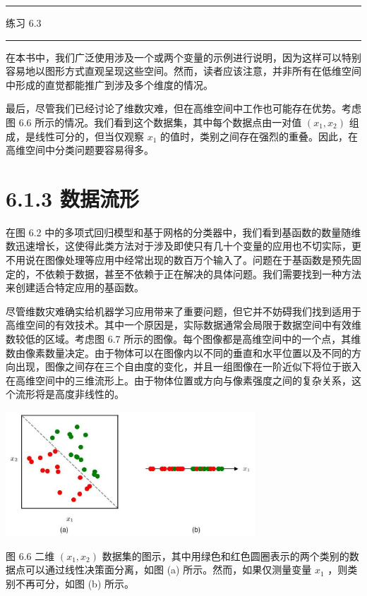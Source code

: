 \documentclass[10pt]{report}
\newcommand{\HRule}{\begin{center}\rule{0.9\linewidth}{0.2mm}\end{center}}
\begin{document}
\HRule

练习 6.3

\HRule

在本书中，我们广泛使用涉及一个或两个变量的示例进行说明，因为这样可以特别容易地以图形方式直观呈现这些空间。然而，读者应该注意，并非所有在低维空间中形成的直觉都能推广到涉及多个维度的情况。

最后，尽管我们已经讨论了维数灾难，但在高维空间中工作也可能存在优势。考虑图 6.6 所示的情况。我们看到这个数据集，其中每个数据点由一对值 \(\left( {{x}_{1},{x}_{2}}\right)\) 组成，是线性可分的，但当仅观察 \({x}_{1}\) 的值时，类别之间存在强烈的重叠。因此，在高维空间中分类问题要容易得多。

\section*{6.1.3 数据流形}

在图 6.2 中的多项式回归模型和基于网格的分类器中，我们看到基函数的数量随维数迅速增长，这使得此类方法对于涉及即使只有几十个变量的应用也不切实际，更不用说在图像处理等应用中经常出现的数百万个输入了。问题在于基函数是预先固定的，不依赖于数据，甚至不依赖于正在解决的具体问题。我们需要找到一种方法来创建适合特定应用的基函数。

尽管维数灾难确实给机器学习应用带来了重要问题，但它并不妨碍我们找到适用于高维空间的有效技术。其中一个原因是，实际数据通常会局限于数据空间中有效维数较低的区域。考虑图 6.7 所示的图像。每个图像都是高维空间中的一个点，其维数由像素数量决定。由于物体可以在图像内以不同的垂直和水平位置以及不同的方向出现，图像之间存在三个自由度的变化，并且一组图像在一阶近似下将位于嵌入在高维空间中的三维流形上。由于物体位置或方向与像素强度之间的复杂关系，这个流形将是高度非线性的。

\begin{center}
\includegraphics[max width=0.7\textwidth]{images/0194e279-9b28-703a-88f4-c3ac21e2010d_196_366_343_985_495_0.jpg}
\end{center}
\hspace*{3em} 

图 6.6 二维 \(\left( {{x}_{1},{x}_{2}}\right)\) 数据集的图示，其中用绿色和红色圆圈表示的两个类别的数据点可以通过线性决策面分离，如图 (a) 所示。然而，如果仅测量变量 \({x}_{1}\) ，则类别不再可分，如图 (b) 所示。
\end{document}
